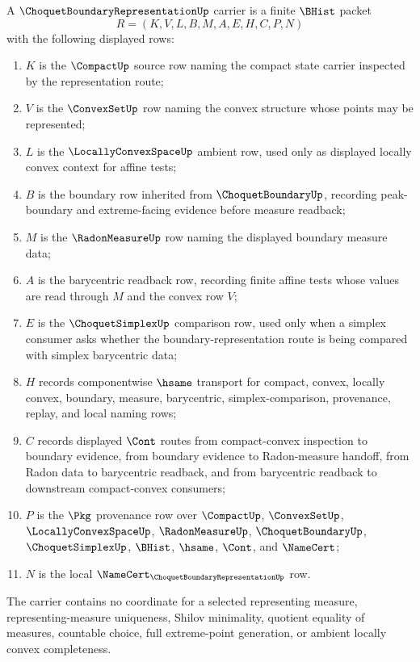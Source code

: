 \begin{definition}
\label{def:choquet-boundary-representation-carrier}
A $\ChoquetBoundaryRepresentationUp$ carrier is a finite $\BHist$ packet
$$
R=(K,V,L,B,M,A,E,H,C,P,N)
$$
with the following displayed rows:
\begin{enumerate}
\item $K$ is the $\CompactUp$ source row naming the compact state carrier inspected by the representation route;
\item $V$ is the $\ConvexSetUp$ row naming the convex structure whose points may be represented;
\item $L$ is the $\LocallyConvexSpaceUp$ ambient row, used only as displayed locally convex context for affine tests;
\item $B$ is the boundary row inherited from $\ChoquetBoundaryUp$, recording peak-boundary and extreme-facing evidence before measure readback;
\item $M$ is the $\RadonMeasureUp$ row naming the displayed boundary measure data;
\item $A$ is the barycentric readback row, recording finite affine tests whose values are read through $M$ and the convex row $V$;
\item $E$ is the $\ChoquetSimplexUp$ comparison row, used only when a simplex consumer asks whether the boundary-representation route is being compared with simplex barycentric data;
\item $H$ records componentwise $\hsame$ transport for compact, convex, locally convex, boundary, measure, barycentric, simplex-comparison, provenance, replay, and local naming rows;
\item $C$ records displayed $\Cont$ routes from compact-convex inspection to boundary evidence, from boundary evidence to Radon-measure handoff, from Radon data to barycentric readback, and from barycentric readback to downstream compact-convex consumers;
\item $P$ is the $\Pkg$ provenance row over $\CompactUp$, $\ConvexSetUp$, $\LocallyConvexSpaceUp$, $\RadonMeasureUp$, $\ChoquetBoundaryUp$, $\ChoquetSimplexUp$, $\BHist$, $\hsame$, $\Cont$, and $\NameCert$;
\item $N$ is the local $\NameCert_{\ChoquetBoundaryRepresentationUp}$ row.
\end{enumerate}
The carrier contains no coordinate for a selected representing measure, representing-measure uniqueness, Shilov minimality, quotient equality of measures, countable choice, full extreme-point generation, or ambient locally convex completeness.
\end{definition}

